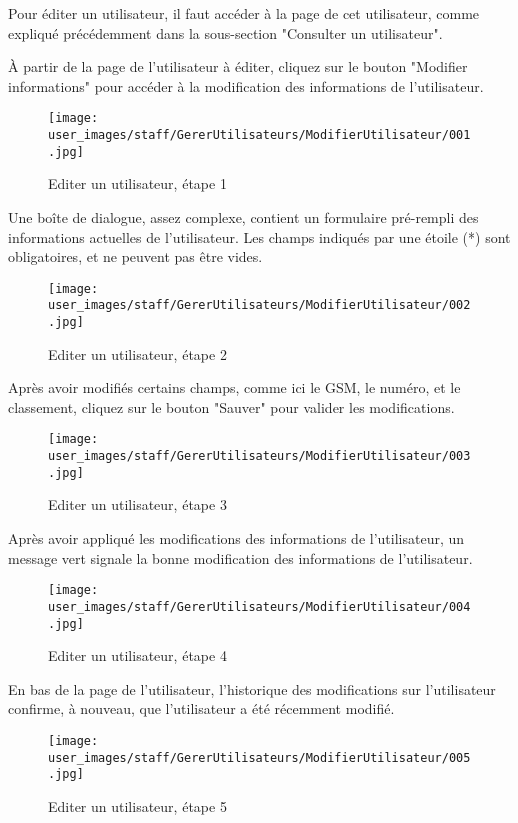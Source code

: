Pour éditer un utilisateur, il faut accéder à la page de cet utilisateur, comme expliqué précédemment dans la sous-section "Consulter un utilisateur".

À partir de la page de l'utilisateur à éditer, cliquez sur le bouton "Modifier informations" pour accéder à la modification des informations de l'utilisateur.

\begin{figure}[H]
\centering
\texttt{[image: user\_images/staff/GererUtilisateurs/ModifierUtilisateur/001.jpg]}
\caption{Editer un utilisateur, étape 1}
\end{figure}

Une boîte de dialogue, assez complexe, contient un formulaire pré-rempli des informations actuelles de l'utilisateur. Les champs indiqués par une étoile (*) sont obligatoires, et ne peuvent pas être vides.

\begin{figure}[H]
\centering
\texttt{[image: user\_images/staff/GererUtilisateurs/ModifierUtilisateur/002.jpg]}
\caption{Editer un utilisateur, étape 2}
\end{figure}

Après avoir modifiés certains champs, comme ici le GSM, le numéro, et le classement, cliquez sur le bouton "Sauver" pour valider les modifications.

\begin{figure}[H]
\centering
\texttt{[image: user\_images/staff/GererUtilisateurs/ModifierUtilisateur/003.jpg]}
\caption{Editer un utilisateur, étape 3}
\end{figure}

Après avoir appliqué les modifications des informations de l'utilisateur, un message vert signale la bonne modification des informations de l'utilisateur.

\begin{figure}[H]
\centering
\texttt{[image: user\_images/staff/GererUtilisateurs/ModifierUtilisateur/004.jpg]}
\caption{Editer un utilisateur, étape 4}
\end{figure}

En bas de la page de l'utilisateur, l'historique des modifications sur l'utilisateur confirme, à nouveau, que l'utilisateur a été récemment modifié.

\begin{figure}[H]
\centering
\texttt{[image: user\_images/staff/GererUtilisateurs/ModifierUtilisateur/005.jpg]}
\caption{Editer un utilisateur, étape 5}
\end{figure}
